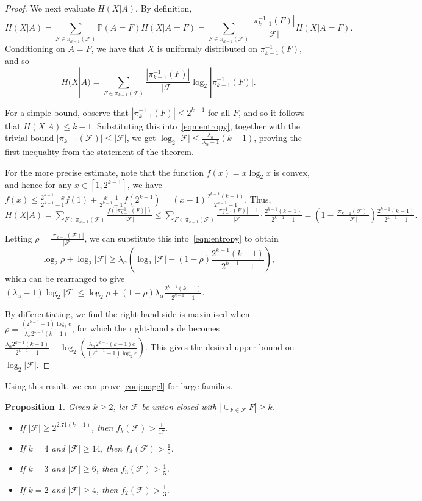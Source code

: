 \documentclass[a4paper,12pt]{article}
\theoremstyle{mystyle}	%
\newtheorem{proposition}[theorem]{Proposition}
\theoremstyle{definition}
\newcommand{\F}{\mathcal{F}}
\renewcommand{\Pr}{\mathbb{P}}
\newcommand{\6}{\partial}
\begin{document}
\begin{proof}
    We next evaluate $H(X|A)$. By definition, 
    \[ H(X|A) = \sum_{F \in \pi_{k-1}(\F)} \Pr(A = F)H(X|A = F) = \sum_{F \in \pi_{k-1}(\F)} \frac{|\pi_{k-1}^{-1}(F)|}{|\F|} H(X|A=F). \] 
    Conditioning on $A = F$, we have that $X$ is uniformly distributed on $\pi_{k-1}^{-1}(F)$, and so 
    \[ H(X|A) = \sum_{F \in \pi_{k-1}(\F)} \frac{|\pi_{k-1}^{-1}(F)|}{|\F|} \log_2 |\pi_{k-1}^{-1}(F)|. \]

    For a simple bound, observe that $|\pi_{k-1}^{-1}(F)| \le 2^{k-1}$ for all $F$, and so it follows that $H(X|A) \le k-1$. Substituting this into~\eqref{eqn:entropy}, together with the trivial bound $|\pi_{k-1}(\F)| \le |\F|$, we get $\log_2 |\F| \le \frac{\lambda_{\alpha}}{\lambda_{\alpha} - 1} (k-1)$, proving the first inequality from the statement of the theorem.

    For the more precise estimate, note that the function $f(x) = x \log_2 x$ is convex, and hence for any $x \in [1, 2^{k-1}]$, we have $f(x) \le \frac{2^{k-1}-x}{2^{k-1} - 1} f(1) + \frac{x - 1}{2^{k-1}-1} f(2^{k-1}) = (x-1)\frac{2^{k-1}(k-1)}{2^{k-1}-1}$. Thus, $H(X|A) = \sum_{F \in \pi_{k-1}(\F)} \frac{f(|\pi_{k-1}^{-1}(F)|)}{|\F|} \le \sum_{F \in \pi_{k-1}(\F)} \frac{|\pi_{k-1}^{-1}(F)|-1}{|\F|} \cdot \frac{2^{k-1}(k-1)}{2^{k-1} - 1} = \left( 1 - \frac{|\pi_{k-1}(\F)|}{|\F|} \right) \frac{2^{k-1}(k-1)}{2^{k-1}-1}.$

    Letting $\rho = \frac{|\pi_{k-1}(\F)|}{|\F|}$, we can substitute this into~\eqref{eqn:entropy} to obtain
    \[ \log_2 \rho + \log_2 |\F| \ge \lambda_\alpha \left( \log_2 |\F| - (1 - \rho) \frac{2^{k-1}(k-1)}{2^{k-1} - 1} \right), \]
    which can be rearranged to give $(\lambda_\alpha - 1) \log_2 |\F| \le \log_2 \rho + (1 - \rho) \lambda_\alpha \frac{2^{k-1}(k-1)}{2^{k-1}-1}$.
    
    By differentiating, we find the right-hand side is maximised when $\rho = \frac{(2^{k-1}-1) \log_2 e}{\lambda_\alpha 2^{k-1} (k-1)}$, for which the right-hand side becomes $\frac{\lambda_\alpha 2^{k-1}(k-1)}{2^{k-1}-1} - \log_2 \left( \frac{\lambda_\alpha 2^{k-1}(k-1)e}{(2^{k-1}-1)\log_2 e}\right)$. This gives the desired upper bound on $\log_2 |\F|$.
    \end{proof}

Using this result, we can prove \cref{conj:nagel} for large families.

\begin{proposition}\label{prop:large}
    Given $k \ge 2$, let $\mathcal{F}$ be union-closed with $|\cup_{F \in \F} F| \ge k$.
    \begin{itemize}
        \item[(a)] If $|\F|\geq 2^{2.71(k-1)}$, then $f_k(\mathcal{F})> \frac{1}{17}$.
        \item[(b)] If $k = 4$ and $|\mathcal{F}|\geq 14$, then $f_4(\mathcal{F})> \frac19$.
        \item[(c)] If $k = 3$ and $|\mathcal{F}|\geq 6$, then $f_3(\mathcal{F})> \frac15$.
        \item[(d)] If $k = 2$ and $|\mathcal{F}|\geq 4$,  then $f_2(\mathcal{F})> \frac13$.
    \end{itemize}
\end{proposition}
\end{document}
